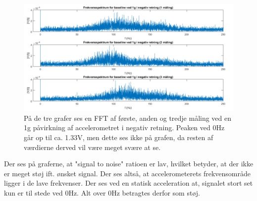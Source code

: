 \begin{figure}[H]
	\centering
	\includegraphics[scale=0.5]{figures/cProblemloesning/Pilotforsoeg_FrekvensN.png}
	\caption{På de tre grafer ses en FFT af første, anden og tredje måling ved en 1g påvirkning af accelerometret i negativ retning. Peaken ved 0Hz går op til ca. 1.33V, men dette ses ikke på grafen, da resten af værdierne derved vil være meget svære at se.}
	\label{Fig:Pilot_FFTN}
\end{figure}

\noindent Der ses på graferne, at "signal to noise" ratioen er lav, hvilket betyder, at der ikke er meget støj ift. ønsket signal. Der ses altså, at accelerometerets frekvensområde ligger i de lave frekvenser. Der ses ved en statisk acceleration at, signalet stort set kun er til stede ved 0Hz. Alt over  0Hz betragtes derfor som støj. 


